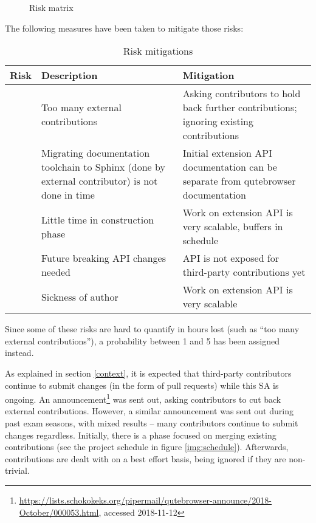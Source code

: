 \begin{figure}[H]
  \caption{Risk matrix}
  \label{img:risiko}
\end{figure}

The following measures have been taken to mitigate those risks:

\begin{table}[H]
  \begin{tabulary}{\linewidth}{lLL}
    \toprule
    Risk & Description & Mitigation \\
    \midrule
     & Too many external contributions & Asking contributors to hold back further contributions; ignoring existing contributions  \\
    \hline
     & Migrating documentation toolchain to Sphinx (done by external contributor)
    is not done in time & Initial extension API documentation can be separate from
    qutebrowser documentation \\
    \hline
     & Little time in construction phase & Work on extension API is very
    scalable, buffers in schedule \\
    \hline
     & Future breaking API changes needed & API is not exposed for third-party
    contributions yet \\
    \hline
     & Sickness of author & Work on extension API is very scalable \\
    \bottomrule
  \end{tabulary}
  \caption{Risk mitigations}
\end{table}

Since some of these risks are hard to quantify in hours lost (such as ``too many
external contributions''), a probability between 1 and 5 has been assigned instead.

As explained in section \ref{context}, it is expected that third-party
contributors continue to submit changes (in the form of pull requests) while
this SA is ongoing. An
announcement\footnote{\url{https://lists.schokokeks.org/pipermail/qutebrowser-announce/2018-October/000053.html},
  accessed 2018-11-12} was sent out, asking contributors to cut back external
contributions. However, a similar announcement was sent out during past exam
seasons, with mixed results -- many contributors continue to submit changes
regardless. Initially, there is a phase focused on merging existing
contributions (see the project schedule in figure \ref{img:schedule}). Afterwards,
contributions are dealt with on a best effort basis, being ignored if they
are non-trivial.

